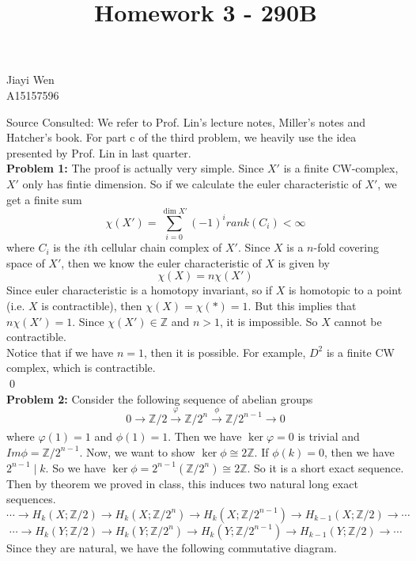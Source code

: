 \documentclass[12pt]{amsart}
\newcommand{\Z}{\mathbb{Z}}
\begin{document}
\title{Homework 3 - 290B}
\maketitle
\begin{center}
    Jiayi Wen\\
    A15157596
\end{center}
Source Consulted: We refer to Prof. Lin's lecture notes, Miller's notes and Hatcher's book. For part c of the third problem, we heavily use the idea presented by Prof. Lin in last quarter. \\
\textbf{Problem 1:} The proof is actually very simple. Since $X'$ is a finite CW-complex, $X'$ only has fintie dimension. So if we calculate the euler characteristic of $X'$, we get a finite sum
\[\chi(X')=\sum_{i=0}^{\dim X'}(-1)^i rank (C_i)<\infty\]
where $C_i$ is the $i$th cellular chain complex of $X'.$  Since $X$ is a $n$-fold covering space of $X'$, then we know the euler characteristic of $X$ is given by
\[\chi(X)=n\chi(X')\]
Since euler characteristic is a homotopy invariant, so if $X$ is homotopic to a point (i.e. $X$ is contractible), then $\chi(X)=\chi(\ast)=1$. But this implies that $n\chi(X')=1$. Since $\chi(X')\in\Z$ and $n>1$, it is impossible. So $X$ cannot be contractible.\\
Notice that if we have $n=1$, then it is possible. For example, $D^2$ is a finite CW complex, which is contractible.
\\\qed\\
\textbf{Problem 2:}
Consider the following sequence of abelian groups
\[0\to \Z/2\xrightarrow[]{\varphi}\Z/2^{n}\xrightarrow[]{\phi}\Z/2^{n-1}\to 0\]
where $\varphi(1)=1$ and $\phi(1)=1$. Then we have $\ker \varphi=0$ is trivial and $Im\phi=\Z/2^{n-1}$. Now, we want to show $\ker\phi\cong 2\Z$. If $\phi(k)=0$, then we have $2^{n-1}\mid k.$ So we have $\ker \phi=2^{n-1}(\Z/2^n)\cong 2\Z$. So it is a short exact sequence. Then by theorem we proved in class, this induces two natural long exact sequences.
\[\cdots \to H_k(X;\Z/2)\to H_k(X;\Z/2^{n})\to H_k(X;\Z/2^{n-1})\to H_{k-1}(X;\Z/2)\to \cdots \]
\[\cdots \to H_k(Y;\Z/2)\to H_k(Y;\Z/2^{n})\to H_k(Y;\Z/2^{n-1})\to H_{k-1}(Y;\Z/2)\to \cdots \]
Since they are natural, we have the following commutative diagram.\\
\begin{center}
\end{center}
\end{document}
